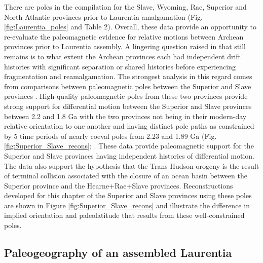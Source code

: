 \documentclass[11pt,letterpaper]{article}
\begin{document}
There are poles in the compilation for the Slave, Wyoming, Rae, Superior and North Atlantic provinces prior to Laurentia amalgamation (Fig. \ref{fig:Laurentia_poles} and Table 2). Overall, these data provide an opportunity to re-evaluate the paleomagnetic evidence for relative motions between Archean provinces prior to Laurentia assembly. A lingering question raised in \citet{Hoffman1988a} that still remains is to what extent the Archean provinces each had independent drift histories with significant separation or shared histories before experiencing fragmentation and reamalgamation. The strongest analysis in this regard comes from comparisons between paleomagnetic poles between the Superior and Slave provinces \citep{Buchan2009a, Mitchell2014a, Buchan2016a}. High-quality paleomagnetic poles from these two provinces provide strong support for differential motion between the Superior and Slave provinces between 2.2 and 1.8 Ga with the two provinces not being in their modern-day relative orientation to one another and having distinct pole paths as constrained by 5 time periods of nearly coeval poles from 2.23 and 1.89 Ga (Fig. \ref{fig:Superior_Slave_recons}; \citealp{Buchan2016a}. These data provide paleomagnetic support for the Superior and Slave provinces having independent histories of differential motion. The data also support the hypothesis that the Trans-Hudson orogeny is the result of terminal collision associated with the closure of an ocean basin between the Superior province and the Hearne+Rae+Slave provinces. Reconstructions developed for this chapter of the Superior and Slave provinces using these poles are shown in Figure \ref{fig:Superior_Slave_recons} and illustrate the difference in implied orientation and paleolatitude that results from these well-constrained poles.

\subsection{Paleogeography of an assembled Laurentia}
\end{document}
